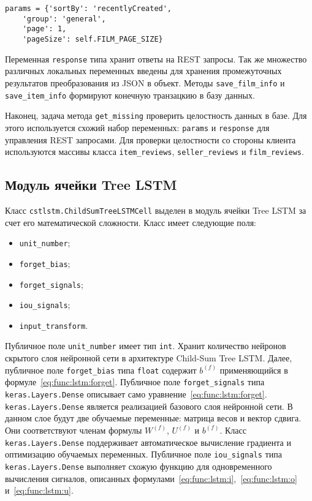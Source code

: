 \medskip
\begin{lstlisting}[style=Python]
  params = {'sortBy': 'recentlyCreated',
    'group': 'general',
    'page': 1,
    'pageSize': self.FILM_PAGE_SIZE}
\end{lstlisting}
\medskip

Переменная \texttt{response} типа хранит ответы на REST запросы. Так же множество различных локальных переменных введены для хранения промежуточных результатов преобразования из JSON в объект. Методы \texttt{save\_fi\-lm\_info} и \texttt{save\_item\_info} формируют конечную транзацкию в базу данных.

Наконец, задача метода \texttt{get\_missing} проверить целостность данных в базе. Для этого используется схожий набор переменных: \texttt{params} и \texttt{response} для управления REST запросами. Для проверки целостности со стороны клиента используются массивы класса \texttt{item\_reviews}, \texttt{seller\_reviews} и \texttt{film\_\-reviews}.
\subsection{Модуль ячейки Tree LSTM}
Класс \texttt{cstlstm.ChildSumTreeLSTMCell} выделен в модуль ячейки Tree LSTM за счет его математической сложности. Класс имеет следующие поля:
\begin{itemize}
\item \texttt{unit\_number};
\item \texttt{forget\_bias};
\item \texttt{forget\_signals};
\item \texttt{iou\_signals};
\item \texttt{input\_transform}.
\end{itemize}

Публичное поле \texttt{unit\_number} имеет тип \texttt{int}. Хранит количество нейронов скрытого слоя нейронной сети в архитектуре Child-Sum Tree LSTM\@. Далее, публичное поле \texttt{forget\_bias} типа \texttt{float} содержит $b^{(f)}$ применяющийся в формуле~\ref{eq:func:lstm:forget}. Публичное поле \texttt{forget\_signals} типа \texttt{keras.Layers.Dense} описывает само уравнение~\ref{eq:func:lstm:forget}. \texttt{keras.Layers.Dense} является реализацией базового слоя нейронной сети. В данном слое будут две обучаемые переменные: матрица весов и вектор сдвига. Они соответствуют членам формулы $W^{(f)}$, $U^{(f)}$ и $b^{(f)}$. Класс \texttt{keras.Layers.Dense} поддерживает автоматическое вычисление градиента и оптимизацию обучаемых переменных. Публичное поле \texttt{iou\_signals} типа \texttt{keras.Layers.Dense} выполняет схожую функцию для одновременного вычисления сигналов, описанных формулами~\ref{eq:func:lstm:i},~\ref{eq:func:lstm:o} и~\ref{eq:func:lstm:u}.

